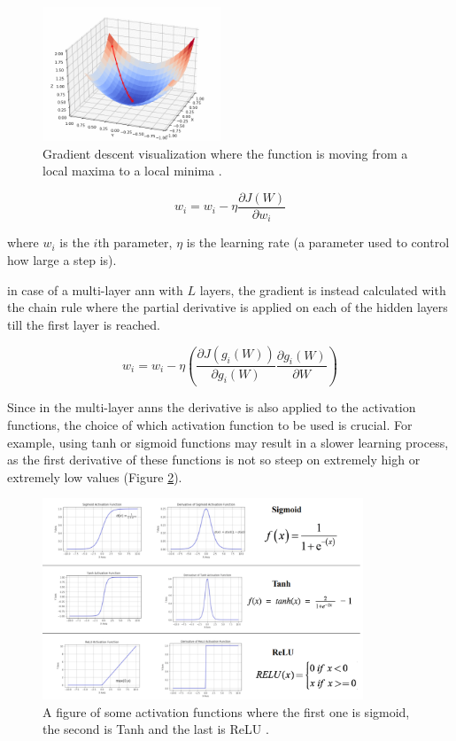 \documentclass[runningheads]{llncs}
\begin{document}
\begin{figure}[H]
    \label{gd}
    \centering
    \includegraphics[height=4cm]{gd}
    \caption{Gradient descent visualization where the function is moving from a local maxima to a local minima \cite{gdwiki}.}
\end{figure}

\begin{equation}
    \label{gdu}
w_{i} = w_{i} - \eta \frac{\partial J(W)}{\partial w_{i}}
\end{equation}

where $w_{i}$ is the $i$th parameter, $\eta$ is the learning rate (a parameter used to control how large a step is).

in case of a multi-layer \gls{ann} with $L$ layers, the gradient is instead calculated 
with the chain rule where the partial derivative is applied on each of the hidden layers
till the first layer is reached.

\begin{equation}
    \label{gdu}
w_{i} = w_{i} - \eta (\frac{\partial J(g_{i}(W))}{\partial g_{i}(W)}\frac{\partial g_{i}(W)}{\partial W})
\end{equation}

Since in the multi-layer \gls{anns} the derivative is also applied to the activation functions,
the choice of which activation function to be used is crucial. For example, using 
tanh or sigmoid functions may result in a slower learning process, as the first derivative of these functions
is not so steep on extremely high or extremely low values (Figure \ref{actfig}).

\begin{figure}[H]
    \label{actfig}
    \centering
    \includegraphics[height=6cm]{actfig}
    \caption{A figure of some activation functions where the first one is sigmoid, the second is Tanh and the last is ReLU \cite{sdc}.}
\end{figure}
\end{document}
